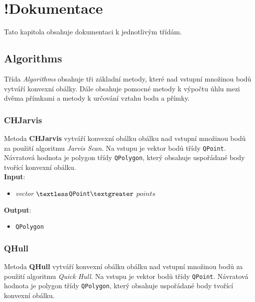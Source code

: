 \documentclass[a4paper, 12pt]{article}
\begin{document}

\clearpage
 
\section{!Dokumentace}
Tato kapitola obsahuje dokumentaci k jednotlivým třídám.

\subsection{Algorithms}
Třída \textit{Algorithms} obsahuje tři základní metody, které nad vstupní množinou bodů vytváří konvexní obálky. Dále obsahuje pomocné metody k výpočtu úhlu mezi dvěma přímkami a metody k určování vztahu bodu a přímky.

\subsubsection{CHJarvis}
Metoda \textbf{CHJarvis} vytváří konvexní obálku obálku nad vstupní množinou bodů za použití algoritmu \textit{Jarvis Scan}. Na vstupu je vektor bodů třídy \texttt{QPoint}. Návratová hodnota je polygon třídy \texttt{QPolygon}, který obsahuje uspořádané body tvořící konvexní obálku.\\

\textbf{Input}:
\begin{itemize}
\item \textsl{vector} $\textless$\texttt{QPoint}$\textgreater$ $points$
\end{itemize}

\textbf{Output}:
\begin{itemize}
\item \texttt{QPolygon}
\end{itemize}

\subsubsection{QHull}
Metoda \textbf{QHull} vytváří konvexní obálku obálku nad vstupní množinou bodů za použití algoritmu \textit{Quick Hull}. Na vstupu je vektor bodů třídy \texttt{QPoint}. Návratová hodnota je polygon třídy \texttt{QPolygon}, který obsahuje uspořádané body tvořící konvexní obálku.\\
\end{document}
